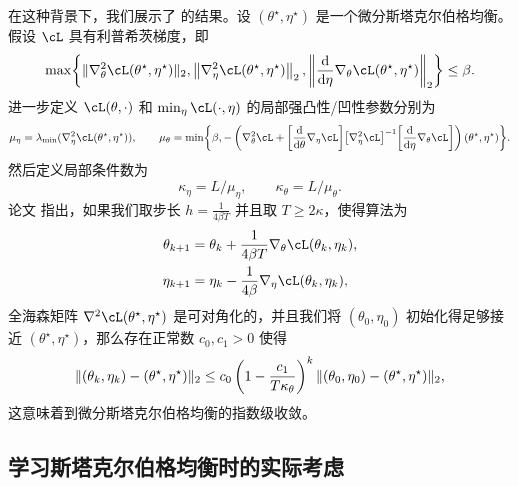\documentclass[../../book-main.tex]{subfiles}
\begin{document}
在这种背景下，我们展示了 \cite{li2022convergence} 的结果。设 \((\theta^{\star}, \eta^{\star})\) 是一个微分斯塔克尔伯格均衡。假设 \(\cL\) 具有利普希茨梯度，即
\begin{equation}
    \max\rc{\norm{\nabla_{\theta}^{2}\cL(\theta^{\star}, \eta^{\star})}_{2}, \norm*{\nabla_{\eta}^{2}\cL(\theta^{\star}, \eta^{\star})}_{2},  \norm*{\odv*{\nabla_{\theta}\cL(\theta^{\star}, \eta^{\star})}{\eta}}_{2}} \leq \beta.
\end{equation}
进一步定义 \(\cL(\theta, \cdot)\) 和 \(\min_{\eta}\cL(\cdot, \eta)\) 的局部强凸性/凹性参数分别为
\begin{equation}
    \mu_{\eta} = \lambda_{\min}(\nabla_{\eta}^{2}\cL(\theta^{\star}, \eta^{\star})), \qquad \mu_{\theta} = \min\rc{\beta, -\bp{\nabla_{\theta}^{2}\cL + \rs{\odv*{\nabla_{\eta}\cL}{\theta}}\rs{\nabla_{\eta}^{2}\cL}^{-1}\rs{\odv*{\nabla_{\theta}\cL}{\eta}}}(\theta^{\star}, \eta^{\star})}.
\end{equation}
然后定义局部条件数为
\begin{equation}
    \kappa_{\eta} = L/\mu_{\eta}, \qquad \kappa_{\theta} = L/\mu_{\theta}.
\end{equation}
论文 \cite{li2022convergence} 指出，如果我们取步长 \(h = \frac{1}{4\beta T}\) 并且取 \(T \geq 2\kappa\)，使得算法为
\begin{align}
    \theta_{k + 1}
    &= \theta_{k} + \frac{1}{4\beta T}\nabla_{\theta} \cL(\theta_{k}, \eta_{k}), \\
    \eta_{k + 1}
    &= \eta_{k} - \frac{1}{4\beta}\nabla_{\eta} \cL(\theta_{k}, \eta_{k}),
\end{align}
全海森矩阵 \(\nabla^{2}\cL(\theta^{\star}, \eta^{\star})\) 是可对角化的，并且我们将 \((\theta_{0}, \eta_{0})\) 初始化得足够接近 \((\theta^{\star}, \eta^{\star})\)，那么存在正常数 \(c_{0}, c_{1} > 0\) 使得
\begin{equation}
    \norm{(\theta_{k}, \eta_{k}) - (\theta^{\star}, \eta^{\star})}_{2} \leq c_{0}\bp{1 - \frac{c_{1}}{T\kappa_{\theta}}}^{k}\norm{(\theta_{0}, \eta_{0}) - (\theta^{\star}, \eta^{\star})}_{2},
\end{equation}
这意味着到微分斯塔克尔伯格均衡的指数级收敛。

\subsection{学习斯塔克尔伯格均衡时的实际考虑}
\end{document}
